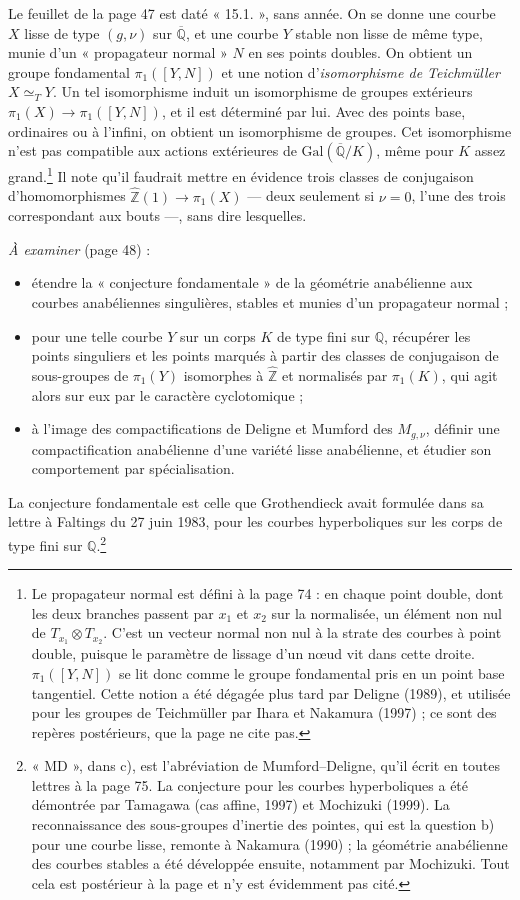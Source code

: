 \documentclass[11pt,a4paper]{article}
\begin{document}
Le feuillet de la page 47 est daté « 15.1. », sans année. On se donne une
courbe $X$ lisse de type $(g,\nu)$ sur $\overline{\mathbb{Q}}$, et une courbe
$Y$ stable non lisse de même type, munie d'un « propagateur normal » $N$ en
ses points doubles. On obtient un groupe fondamental $\pi_1([Y,N])$ et une
notion d'\emph{isomorphisme de Teichmüller} $X \simeq_T Y$. Un tel isomorphisme
induit un isomorphisme de groupes extérieurs $\pi_1(X) \to \pi_1([Y,N])$, et
il est déterminé par lui. Avec des points base, ordinaires ou à l'infini, on
obtient un isomorphisme de groupes. Cet isomorphisme n'est pas compatible aux
actions extérieures de $\mathrm{Gal}(\overline{\mathbb{Q}}/K)$, même pour $K$
assez grand.\footnote{Le propagateur normal est défini à la page 74 : en
chaque point double, dont les deux branches passent par $x_1$ et $x_2$ sur la
normalisée, un élément non nul de $T_{x_1} \otimes T_{x_2}$. C'est un vecteur
normal non nul à la strate des courbes à point double, puisque le paramètre de
lissage d'un nœud vit dans cette droite. $\pi_1([Y,N])$ se lit donc comme le
groupe fondamental pris en un point base tangentiel. Cette notion a été
dégagée plus tard par Deligne (1989), et utilisée pour les groupes de
Teichmüller par Ihara et Nakamura (1997) ; ce sont des repères postérieurs,
que la page ne cite pas.} Il note qu'il faudrait mettre en évidence trois
classes de conjugaison d'homomorphismes $\hat{\mathbb{Z}}(1) \to \pi_1(X)$ ---
deux seulement si $\nu = 0$, l'une des trois correspondant aux bouts ---,
sans dire lesquelles.

\emph{À examiner} (page 48) :
\begin{itemize}
  \item[a)] étendre la « conjecture fondamentale » de la géométrie anabélienne
  aux courbes anabéliennes singulières, stables et munies d'un propagateur
  normal ;
  \item[b)] pour une telle courbe $Y$ sur un corps $K$ de type fini sur
  $\mathbb{Q}$, récupérer les points singuliers et les points marqués à partir
  des classes de conjugaison de sous-groupes de $\pi_1(Y)$ isomorphes à
  $\hat{\mathbb{Z}}$ et normalisés par $\pi_1(K)$, qui agit alors sur eux par
  le caractère cyclotomique ;
  \item[c)] à l'image des compactifications de Deligne et Mumford des
  $M_{g,\nu}$, définir une compactification anabélienne d'une variété lisse
  anabélienne, et étudier son comportement par spécialisation.
\end{itemize}

La conjecture fondamentale est celle que Grothendieck avait formulée dans sa
lettre à Faltings du 27 juin 1983, pour les courbes hyperboliques sur les
corps de type fini sur $\mathbb{Q}$.\footnote{« MD », dans c), est l'abréviation
de Mumford--Deligne, qu'il écrit en toutes lettres à la page 75. La conjecture
pour les courbes hyperboliques a été démontrée par Tamagawa (cas affine, 1997)
et Mochizuki (1999). La reconnaissance des sous-groupes d'inertie des pointes,
qui est la question b) pour une courbe lisse, remonte à Nakamura (1990) ; la
géométrie anabélienne des courbes stables a été développée ensuite, notamment
par Mochizuki. Tout cela est postérieur à la page et n'y est évidemment pas
cité.}
\end{document}
